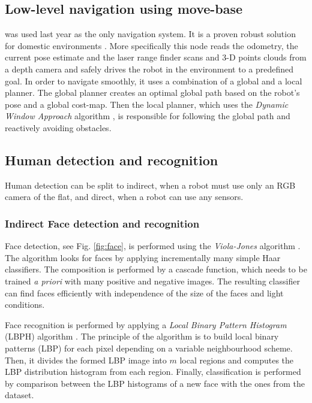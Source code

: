 \subsection{Low-level navigation using move-base} was used last year as the only navigation system. It is a proven robust solution for domestic environments \cite{Marder-Eppstein2010}. More specifically this node reads the odometry, the current pose estimate and the laser range finder scans and 3-D points clouds from a depth camera and safely drives the robot in the environment to a predefined goal. In order to navigate smoothly, it uses a combination of a global and a local planner. The global planner creates an optimal global path based on the robot's pose and a global cost-map. Then the local planner, which uses the \textit{Dynamic Window Approach} algorithm \cite{dwa}, is responsible for following the global path and reactively avoiding obstacles. 



\subsection{Human detection and recognition}

Human detection can be split to indirect, when a robot must use only an RGB camera of the flat, and direct, when a robot can use any sensors. 

\subsubsection{\label{sec:vision}Indirect Face detection and recognition}

Face detection, see Fig. \ref{fig:face}, is performed using the \textit{Viola-Jones} algorithm \cite{Viola01_RapidObjDet}. The algorithm looks for faces by applying incrementally many simple Haar classifiers. The composition is performed by a cascade function, which needs to be trained \textit{a priori} with many positive and negative images. The resulting classifier can find faces efficiently with independence of the size of the faces and light conditions.

Face recognition is performed by applying a \textit{Local Binary Pattern Histogram} (LBPH) algorithm \cite{Ahonen04_FaceRecLBP}. The principle of the algorithm is to build local binary patterns (LBP) for each pixel depending on a variable neighbourhood scheme. Then, it divides the formed LBP image into $m$ local regions and computes the LBP distribution histogram from each region. Finally, classification is performed by comparison between the LBP histograms of a new face with the ones from the dataset.

